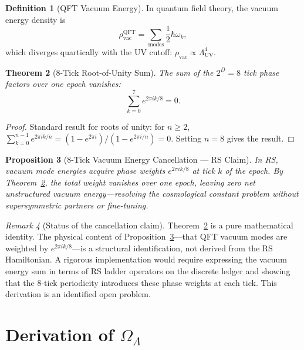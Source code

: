 \documentclass[12pt,a4paper]{article}
\newtheorem{theorem}{Theorem}[section]
\newtheorem{proposition}[theorem]{Proposition}
\theoremstyle{definition}
\newtheorem{definition}[theorem]{Definition}
\theoremstyle{remark}
\newtheorem{remark}[theorem]{Remark}
\begin{document}
\begin{definition}[QFT Vacuum Energy]
In quantum field theory, the vacuum energy density is
\begin{equation}
  \rho_{\mathrm{vac}}^{\mathrm{QFT}} = \sum_{\text{modes}}
  \frac{1}{2}\hbar\omega_k,
\end{equation}
which diverges quartically with the UV cutoff:
$\rho_{\mathrm{vac}} \propto \Lambda_{\mathrm{UV}}^4$.
\end{definition}

\begin{theorem}[8-Tick Root-of-Unity Sum]
\label{thm:cancellation}
The sum of the $2^D = 8$ tick phase factors over one epoch vanishes:
\begin{equation}
  \sum_{k=0}^{7} e^{2\pi i k/8} = 0.
\end{equation}
\end{theorem}

\begin{proof}
Standard result for roots of unity: for $n \geq 2$,
$\sum_{k=0}^{n-1} e^{2\pi ik/n} = (1 - e^{2\pi i})/(1 -
e^{2\pi i/n}) = 0$.  Setting $n = 8$ gives the result.
\end{proof}

\begin{proposition}[8-Tick Vacuum Energy Cancellation --- RS Claim]
\label{prop:cancellation}
In RS, vacuum mode energies acquire phase weights $e^{2\pi ik/8}$
at tick $k$ of the epoch.  By Theorem~\ref{thm:cancellation},
the total weight vanishes over one epoch, leaving zero net
unstructured vacuum energy---resolving the cosmological constant
problem without supersymmetric partners or fine-tuning.
\end{proposition}

\begin{remark}[Status of the cancellation claim]
\label{rem:cancel-status}
Theorem~\ref{thm:cancellation} is a pure mathematical identity.
The physical content of Proposition~\ref{prop:cancellation}---that
QFT vacuum modes are weighted by $e^{2\pi ik/8}$---is a structural
identification, not derived from the RS Hamiltonian.  A rigorous
implementation would require expressing the vacuum energy sum in
terms of RS ladder operators on the discrete ledger and showing
that the 8-tick periodicity introduces these phase weights at each
tick.  This derivation is an identified open problem.
\end{remark}

\section{Derivation of $\Omega_\Lambda$}
\label{sec:derivation}
\end{document}
